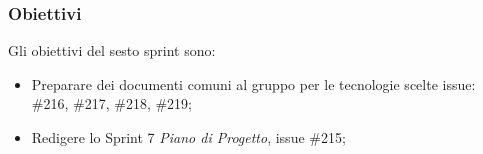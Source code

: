 \subsubsection{Obiettivi}
\label{sec:sprint7_obiettivi}
Gli obiettivi del sesto sprint sono:
\begin{itemize}
    \item Preparare dei documenti comuni al gruppo per le tecnologie scelte issue: \#216, \#217, \#218, \#219;
    \item Redigere lo Sprint 7 \textit{Piano di Progetto}, issue \#215;
\end{itemize}